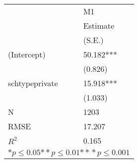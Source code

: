 \begin{tabular}{*{2}{l}}
\hline
                  & M1   \tabularnewline
                   &Estimate \tabularnewline
                 &(S.E.) \tabularnewline
 \hline
 \hline
   (Intercept)     &50.182*** \tabularnewline
                 &(0.826)  \tabularnewline
   schtypeprivate    &15.918*** \tabularnewline
                 &(1.033)  \tabularnewline
 \hline
 N                 &1203       \tabularnewline
 RMSE             &17.207   \tabularnewline
 $R^2$             &0.165   \tabularnewline
 \hline
\hline
 
 \multicolumn{2}{c}{${*  p}\le 0.05$${*\!\!*  p}\le 0.01$${*\!\!*\!\!*  p}\le 0.001$}\tabularnewline
 \end{tabular}